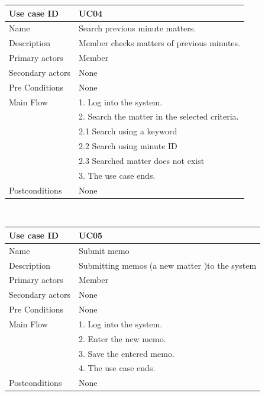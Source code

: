 \documentclass[a4paper,beamer]{article}
\begin{document}
			\begin{tabular}{|p{4cm}|p{8cm}|} \hline 
					\textbf{Use case ID} & \textbf{UC04}  \\ \hline
					Name & Search previous minute matters.\\ \hline 
					Description & Member checks  matters of previous minutes.\\ \hline 
					Primary actors & Member \\ \hline 
					Secondary actors & None \\ \hline 
					Pre Conditions & None \\ \hline
					Main Flow & 1. Log into the system.\\
							& 2. Search the matter in the selected criteria.\\ 
							& 2.1  Search using a keyword \\
							& 2.2  Search  using minute ID\\
							& 2.3  Searched matter does not exist\\
							& 3. The use case ends.\\ \hline
					Postconditions & None \\ \hline 
			\end{tabular} \\[.6cm]
			
			\begin{tabular}{|p{4cm}|p{8cm}|} \hline 
					\textbf{Use case ID} & \textbf{UC05}  \\ \hline
					Name & Submit memo \\ \hline 
					Description & Submitting  memos (a new matter )to the system \\ \hline 
					Primary actors & Member \\ \hline 
					Secondary actors & None \\ \hline 
					Pre Conditions & None \\ \hline
					Main Flow & 1. Log into the system.\\
										& 2. Enter the new memo. \\
										& 3. Save the entered memo.\\
										& 4. The use case ends.\\ \hline
					Postconditions & None \\ \hline 
			\end{tabular} \\[.6cm]
			
\end{document}

